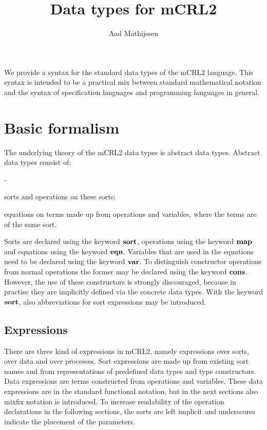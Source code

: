 \documentclass[a4paper,fleqn]{article}
\title{Data types for mCRL2}
\author{Aad Mathijssen}
\newenvironment{tdefinitions}[2][0.15em]
  {\begin{list}%
    {#2}%
    {\setlength{\parsep}{0pt}%
     \setlength{\itemsep}{#1}%
     \setlength{\leftmargin}{\mathindent}%
     \setlength{\labelwidth}{\mathindent - \labelsep}%
    }
  }
  {\end{list}}
\newcommand{\frm}[1]{\mbox{\ensuremath{#1}}}
\newlength{\tlength}
\newcommand{\kwsort}{{\bf sort}}
\newcommand{\kwcons}{{\bf cons}}
\newcommand{\kwmap}{{\bf map}}
\newcommand{\kwvar}{{\bf var}}
\newcommand{\kweqn}{{\bf eqn}}
\begin{document}
\maketitle

\noindent
We provide a syntax for the standard data types of the mCRL2 language. This
syntax is intended to be a practical mix between standard mathematical notation
and the syntax of specification languages and programming languages in general.

\section{Basic formalism}

The underlying theory of the mCRL2 data types is abstract data types.
Abstract data types consist of:
\begin{tdefinitions}{-}
\item sorts and operations on these sorts;
\item equations on terms made up from operations and variables, where the terms
      are of the same sort.
\end{tdefinitions}

\noindent
Sorts are declared using the keyword \frm{\kwsort}, operations using the
keyword \frm{\kwmap} and equations using the keyword \frm{\kweqn}. Variables
that are used in the equations need to be declared using the keyword
\frm{\kwvar}. To distinguish constructor operations from normal operations the
former may be declared using the keyword \frm{\kwcons}. However, the use of
these constructors is strongly discouraged, because in practise they are
implicitly defined via the concrete data types. With the keyword \frm{\kwsort},
also abbreviations for sort expressions may be introduced.

\subsection{Expressions}

There are three kind of expressions in mCRL2, namely expressions over sorts,
over data and over processes. Sort expressions are made up from existing sort
names and from representations of predefined data types and type constructors.
Data expressions are terms constructed from operations and variables. These
data expressions are in the standard functional notation, but in the next
sections also mixfix notation is introduced. To increase readability of the
operation declarations in the following sections, the sorts are left implicit
and underscores indicate the placement of the parameters.
\end{document}

